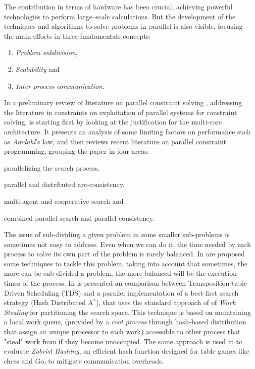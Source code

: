 The contribution in terms of hardware has been crucial, achieving powerful technologies to perform large--scale calculations. But the development of the techniques and algorithms to solve problems in parallel is also visible, focusing the main efforts in three fundamentals concepts: 
\begin{enumerate}%
    \item {\it Problem subdivision},
    \item {\it Scalability} and
    \item {\it Inter-process communication}.
\end{enumerate}%

In a preliminary review of literature on parallel constraint solving \cite{Gent}, addressing the literature in constraints on exploitation of parallel systems for constraint solving, is starting first by looking at the justification for the multi-core architecture. It presents an analysis of some limiting factors on performance such as \textit{Amdahl}'s law, and then reviews recent literature on parallel constraint programming, grouping the paper in four areas: 
\begin{inparaenum}[i)]
	\item parallelizing the search process,  
	\item parallel and distributed arc-consistency, 
	\item multi-agent and cooperative search and
	\item combined parallel search and parallel consistency.
\end{inparaenum}

The issue of sub-dividing a given problem in some smaller sub-problems is sometimes not easy to address. Even when we can do it, the time needed by each process to solve its own part of the problem is rarely balanced. In \cite{Rezgui2013} are proposed some techniques to tackle this problem, taking into account that sometimes, the more can be sub-divided a problem, the more balanced will be the execution times of the process. In \cite{Kishimoto2013} is presented an comparison between Transposition-table Driven Scheduling (TDS) and a parallel implementation of a best-first search strategy (Hash Distributed A$^*$), that uses the standard approach of of \textit{Work Stealing} for partitioning the search space. This technique is based on maintaining a local work queue, (provided by a \textit{root process} through hash-based distribution that assign an unique processor to each work) accessible to other process that "steal" work from if they become unoccupied. The same approach is used in \cite{Jinnai} to evaluate \textit{Zobrist Hashing}, an efficient hash function designed for table games like chess and Go, to mitigate communication overheads.

